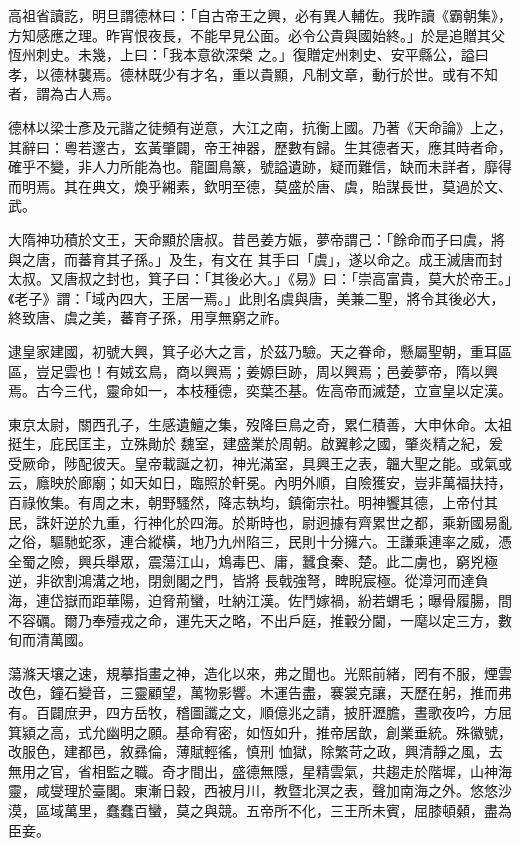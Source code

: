 \begin{pinyinscope}
 高祖省讀訖，明旦謂德林曰：「自古帝王之興，必有異人輔佐。我昨讀《霸朝集》，方知感應之理。昨宵恨夜長，不能早見公面。必令公貴與國始終。」於是追贈其父恆州刺史。未幾，上曰：「我本意欲深榮
 之。」復贈定州刺史、安平縣公，謚曰孝，以德林襲焉。德林既少有才名，重以貴顯，凡制文章，動行於世。或有不知者，謂為古人焉。



 德林以梁士彥及元諧之徒頻有逆意，大江之南，抗衡上國。乃著《天命論》上之，其辭曰：粵若邃古，玄黃肇闢，帝王神器，歷數有歸。生其德者天，應其時者命，確乎不變，非人力所能為也。龍圖鳥篆，號謚遺跡，疑而難信，缺而未詳者，靡得而明焉。其在典文，煥乎緗素，欽明至德，莫盛於唐、虞，貽謀長世，莫過於文、武。



 大隋神功積於文王，天命顯於唐叔。昔邑姜方娠，夢帝謂己：「餘命而子曰虞，將與之唐，而蕃育其子孫。」及生，有文在
 其手曰「虞」，遂以命之。成王滅唐而封太叔。又唐叔之封也，箕子曰：「其後必大。」《易》曰：「崇高富貴，莫大於帝王。」《老子》謂：「域內四大，王居一焉。」此則名虞與唐，美兼二聖，將令其後必大，終致唐、虞之美，蕃育子孫，用享無窮之祚。



 逮皇家建國，初號大興，箕子必大之言，於茲乃驗。天之眷命，懸屬聖朝，重耳區區，豈足雲也！有娀玄鳥，商以興焉；姜嫄巨跡，周以興焉；邑姜夢帝，隋以興焉。古今三代，靈命如一，本枝種德，奕葉丕基。佐高帝而滅楚，立宣皇以定漢。



 東京太尉，關西孔子，生感遺鱣之集，歿降巨鳥之奇，累仁積善，大申休命。太祖挺生，庇民匡主，立殊勛於
 魏室，建盛業於周朝。啟翼軫之國，肇炎精之紀，爰受厥命，陟配彼天。皇帝載誕之初，神光滿室，具興王之表，韞大聖之能。或氣或云，廕映於廊廟；如天如日，臨照於軒冕。內明外順，自險獲安，豈非萬福扶持，百祿攸集。有周之末，朝野騷然，降志執均，鎮衛宗社。明神饗其德，上帝付其民，誅奸逆於九重，行神化於四海。於斯時也，尉迥據有齊累世之都，乘新國易亂之俗，驅馳蛇豕，連合縱橫，地乃九州陷三，民則十分擁六。王謙乘連率之威，憑全蜀之險，興兵舉眾，震蕩江山，鴆毒巴、庸，蠶食秦、楚。此二虜也，窮兇極逆，非欲割鴻溝之地，閉劍閣之門，皆將
 長戟強弩，睥睨宸極。從漳河而達負海，連岱嶽而距華陽，迫脅荊蠻，吐納江漢。佐鬥嫁禍，紛若蝟毛；曝骨履腸，間不容礪。爾乃奉殪戎之命，運先天之略，不出戶庭，推轂分閫，一麾以定三方，數旬而清萬國。



 蕩滌天壤之速，規摹指畫之神，造化以來，弗之聞也。光熙前緒，罔有不服，煙雲改色，鐘石變音，三靈顧望，萬物影響。木運告盡，褰裳克讓，天歷在躬，推而弗有。百闢庶尹，四方岳牧，稽圖讖之文，順億兆之請，披肝瀝膽，晝歌夜吟，方屈箕潁之高，式允幽明之願。基命宥密，如恆如升，推帝居歆，創業垂統。殊徽號，改服色，建都邑，敘彞倫，薄賦輕徭，慎刑
 恤獄，除繁苛之政，興清靜之風，去無用之官，省相監之職。奇才間出，盛德無隱，星精雲氣，共趨走於階墀，山神海靈，咸燮理於臺閣。東漸日穀，西被月川，教暨北溟之表，聲加南海之外。悠悠沙漠，區域萬里，蠢蠢百蠻，莫之與競。五帝所不化，三王所未賓，屈膝頓顙，盡為臣妾。




\end{pinyinscope}

